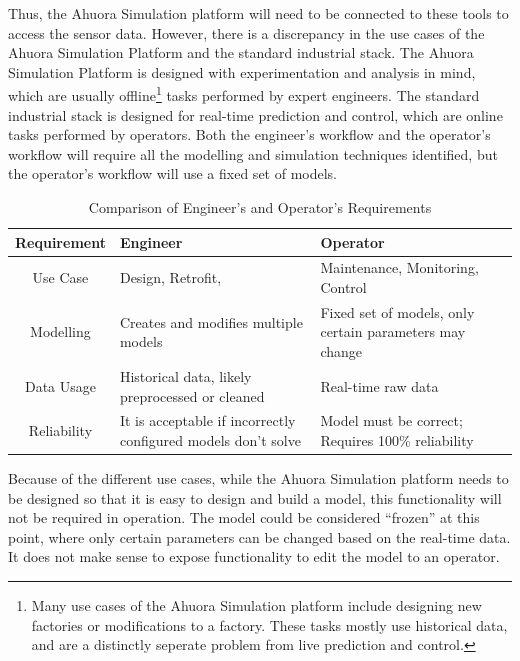 \documentclass[12pt]{report}
\begin{document}
 Thus, the Ahuora Simulation platform will need to be connected to these tools to access the sensor data. However, there is a discrepancy in the use cases of the Ahuora Simulation Platform and the standard industrial stack. The Ahuora Simulation Platform is designed with experimentation and analysis in mind, which are usually offline\footnote{Many use cases of the Ahuora Simulation platform include designing new factories or modifications to a factory. These tasks mostly use historical data, and are a distinctly seperate problem from live prediction and control.} tasks performed by expert engineers. The standard industrial stack is designed for real-time prediction and control, which are online tasks performed by operators. Both the engineer's workflow and the operator's workflow will require all the modelling and simulation techniques identified, but the operator's workflow will use a fixed set of models.

\begin{table}[ht]
    \centering
    \caption{Comparison of Engineer's and Operator's Requirements}
    \begin{tabular}{|c|p{}|p{}|}
        \hline
        \textbf{Requirement} & \textbf{Engineer} & \textbf{Operator} \\
        \hline
        Use Case & Design, Retrofit, & Maintenance, Monitoring, Control \\
        \hline
        Modelling & Creates and modifies multiple models & Fixed set of models, only certain parameters may change\\
        \hline
        Data Usage & Historical data, likely preprocessed or cleaned & Real-time raw data \\
        \hline
        Reliability & It is acceptable if incorrectly configured models don't solve & Model must be correct; Requires 100\% reliability \\
        \hline
    \end{tabular}
    \label{tab:requirements}
\end{table}

Because of the different use cases, while the Ahuora Simulation platform needs to be designed so that it is easy to design and build a model, this functionality will not be required in operation. The model could be considered ``frozen'' at this point, where only certain parameters can be changed based on the real-time data. It does not make sense to expose functionality to edit the model to an operator. 
\end{document}

